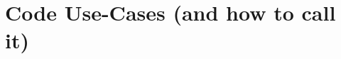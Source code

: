 





\chapter{Code Use-Cases (and how to call it)} %

\label{AppendixA} 

\vspace{-0.8cm}

\label{ap:usecase_click}

\label{ap:usecase_snakemake}

\label{ap:usecase_notebook}


%

